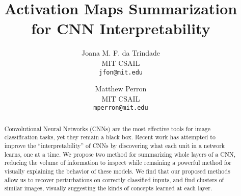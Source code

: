 \documentclass[10pt,twocolumn,letterpaper]{article}
\begin{document}
\title{Activation Maps Summarization for CNN Interpretability}

\author{Joana M. F. da Trindade\\
MIT CSAIL\\
{\tt\small jfon@mit.edu}
\and Matthew Perron\\
MIT CSAIL\\
{\tt\small mperron@mit.edu}
}

\maketitle

\begin{abstract}
Convolutional Neural Networks (CNNs) are the most effective tools for image classification tasks, yet they remain a black box. Recent work has attempted to improve the ``interpretability'' of CNNs by discovering what each unit in a network learns, one at a time. We propose two method for summarizing whole layers of a CNN, reducing the volume of information to inspect while remaining a powerful method for visually explaining the behavior of these models. We find that our proposed methods allow us to recover perturbations on correctly classified inputs, and find clusters of similar images, visually suggesting the kinds of concepts learned at each layer.
\end{abstract}






%

{\small


}
\end{document}
